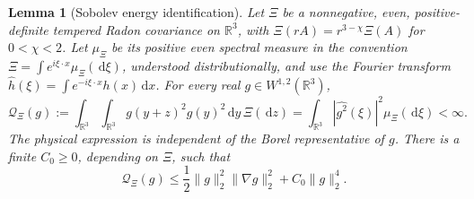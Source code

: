 \documentclass[12pt]{article}
\numberwithin{equation}{section}
\newtheorem{lemma}[theorem]{Lemma}
\theoremstyle{definition}
\newcommand{\R}{\mathbb{R}}
\newcommand{\ud}{\,\mathrm{d}}
\begin{document}
\begin{lemma}[Sobolev energy identification]\label{L:physical-spectral-energy}
  Let $\Xi$ be a nonnegative, even, positive-definite tempered Radon
  covariance on $\R^3$, with
  $\Xi(rA)=r^{3-\chi}\Xi(A)$ for $0<\chi<2$.
  Let $\mu_\Xi$ be its positive even spectral measure in the convention
  $\Xi=\int e^{i\xi\cdot x}\mu_\Xi(\ud\xi)$, understood distributionally,
  and use the Fourier transform
  $\widehat h(\xi)=\int e^{-i\xi\cdot x}h(x)\ud x$.
  For every real $g\in W^{1,2}(\R^3)$,
  \begin{equation}\label{E:physical-spectral-energy}
    \mathcal Q_\Xi(g)
    :=\int_{\R^3}\int_{\R^3}g(y+z)^2g(y)^2\ud y\,\Xi(\ud z)
    =\int_{\R^3}|\widehat{g^2}(\xi)|^2\mu_\Xi(\ud\xi)<\infty.
  \end{equation}
  The physical expression is independent of the Borel representative
  of $g$. There is a finite $C_0\ge0$, depending on $\Xi$, such that
  \begin{equation}\label{E:energy-quartic-bound}
    \mathcal Q_\Xi(g)
    \le\frac12\|g\|_2^2\|\nabla g\|_2^2+C_0\|g\|_2^4.
  \end{equation}
\end{lemma}
\end{document}
